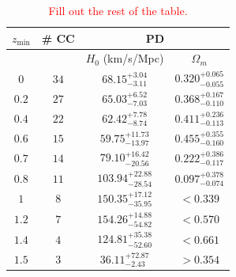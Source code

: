 \documentclass[aps,prl,10pt,twocolumn,superscriptaddress, nofootinbib]{revtex4}
\def\red{\textcolor{red}}
\begin{document}
\begin{table}[htb]
    \centering
    \begin{tabular}{c|c|c|c}
    \rule{0pt}{3ex} $z_{\textrm{min}}$ & \# CC & \multicolumn{2}{c}{PD}  \\
    \hline
    \rule{0pt}{3ex} & & $H_0$ (km/s/Mpc) & $\Omega_m$ \\
    \hline
    \rule{0pt}{3ex} $0$ & $34$ & $68.15^{+3.04}_{-3.11}$ & $0.320^{+0.065}_{-0.055}$ \\
    \hline 
    \rule{0pt}{3ex} $0.2$ & $27$ & $65.03^{+6.52}_{-7.03}$ & $0.368^{+0.167}_{-0.110}$ \\
    \hline 
    \rule{0pt}{3ex} $0.4$ & $22$ & $62.42^{+7.78}_{-8.74}$ & $0.411^{+0.236}_{-0.113}$ \\
    \hline
    \rule{0pt}{3ex} $0.6$ & $15$ & $59.75^{+11.73}_{-13.97}$ & $0.455^{+0.355}_{-0.160}$ \\
    \hline
    \rule{0pt}{3ex} $0.7$ & $14$ & $79.10^{+16.42}_{-20.56}$ & $0.222^{+0.386}_{-0.117}$ \\
    \hline
    \rule{0pt}{3ex} $0.8$ & $11$ & $103.94^{+22.88}_{-28.54}$ & $0.097^{+0.378}_{-0.074}$ \\
    \hline
    \rule{0pt}{3ex} $1$ & $8$ & $150.35^{+17.12}_{-35.95}$ & $ < 0.339$ \\
    \hline
    \rule{0pt}{3ex} $1.2$ & $7$ & $154.26^{+14.88}_{-54.82}$ & $ < 0.570$ \\
    \hline
    \rule{0pt}{3ex} $1.4$ & $4$ & $124.81^{+35.38}_{-52.60}$ & $ < 0.661$ \\
    \hline
    \rule{0pt}{3ex} $1.5$ & $3$ & $36.11^{+72.87}_{-2.43}$ & $ > 0.354$
    \end{tabular}
    \caption{\red{Fill out the rest of the table.}}
    \label{tab:LCDM_CC}
\end{table}
\end{document}
